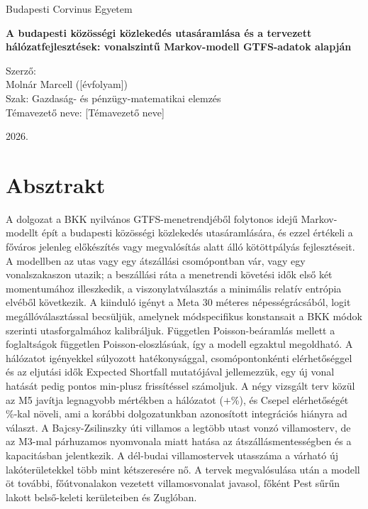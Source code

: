 \documentclass[12pt,a4paper]{article}
\theoremstyle{definition}
\theoremstyle{remark}
\begin{document}
\begin{titlepage}
  \centering
  {\large Budapesti Corvinus Egyetem\par}
  \vspace{5cm}
  {\large\bfseries A budapesti közösségi közlekedés utasáramlása és a tervezett
   hálózatfejlesztések: vonalszintű Markov-modell GTFS-adatok alapján\par}
  \vspace{3.5cm}
  \begin{flushright}
    Szerző:\\
    Molnár Marcell ([évfolyam])\\[10pt]
    Szak: Gazdaság- és pénzügy-matematikai elemzés\\[10pt]
    Témavezető neve: [Témavezető neve]
  \end{flushright}
  \vfill
  2026.
\end{titlepage}

\tableofcontents
\clearpage
\listoffigures
\listoftables
\clearpage

\section*{Absztrakt}

A dolgozat a BKK nyilvános GTFS-menetrendjéből folytonos idejű Markov-modellt
épít a budapesti közösségi közlekedés utasáramlására, és ezzel értékeli a
főváros jelenleg előkészítés vagy megvalósítás alatt álló kötöttpályás
fejlesztéseit. A modellben az utas vagy egy átszállási csomópontban vár, vagy
egy vonalszakaszon utazik; a beszállási ráta a menetrendi követési idők első
két momentumához illeszkedik, a viszonylatválasztás a minimális relatív
entrópia elvéből következik. A kiinduló igényt a Meta 30 méteres
népességrácsából, logit megállóválasztással becsüljük, amelynek
módspecifikus konstansait a BKK módok szerinti utasforgalmához kalibráljuk. Független Poisson-beáramlás mellett a
foglaltságok független Poisson-eloszlásúak, így a modell egzaktul megoldható.
A hálózatot igényekkel súlyozott hatékonysággal, csomópontonkénti
elérhetőséggel és az eljutási idők Expected Shortfall mutatójával jellemezzük,
egy új vonal hatását pedig pontos min-plusz frissítéssel számoljuk. A négy
vizsgált terv közül az M5 javítja legnagyobb mértékben a hálózatot
($+$\PLMFGAIN\%), és Csepel elérhetőségét \PLMFDXXI\%-kal növeli, ami a korábbi
dolgozatunkban azonosított integrációs hiányra ad választ. A Bajcsy-Zsilinszky
úti villamos a legtöbb utast vonzó villamosterv, de az M3-mal párhuzamos
nyomvonala miatt hatása az átszállásmentességben és a kapacitásban
jelentkezik. A dél-budai villamostervek utasszáma a várható új lakóterületekkel
több mint kétszeresére nő. A tervek megvalósulása után a modell öt további,
főútvonalakon vezetett villamosvonalat javasol, főként Pest sűrűn lakott
belső-keleti kerületeiben és Zuglóban.
\end{document}
